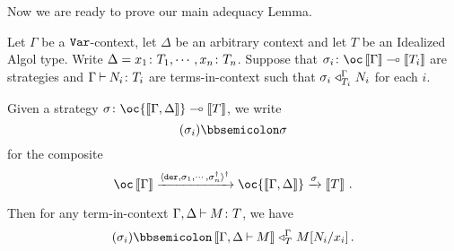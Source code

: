 Now we are ready to prove our main adequacy Lemma.

\begin{lemma}
  Let $\Gamma$ be a ${\mathtt{Var}}$-context, let $\Delta$ be an arbitrary context and let $T$ be an Idealized Algol type.
  Write $\Delta=x_1\colon T_1,\cdots,x_n\colon T_n$.  
  Suppose that $\sigma_i\from \oc\deno{\Gamma} \implies \deno{T_i}$ are strategies and $\Gamma\mathbin{\vdash} N_i\colon T_i$ are terms-in-context such that $\sigma_i\mathrel{\triangleleft}_{T_i}^\Gamma N_i$ for each $i$.  

  Given a strategy $\sigma\from \oc{\deno{\Gamma,\Delta}}\implies \deno{T}$, we write
  \[
    (\sigma_i)\semicom \sigma
    \]
  for the composite
  \[
    \oc\deno{\Gamma} \xrightarrow{\langle \der,\sigma_1,\cdots,\sigma_n^\dag\rangle^\dag} \oc{\deno{\Gamma,\Delta}} \xrightarrow{\sigma} \deno{T}\,.
    \]

  Then for any term-in-context $\Gamma,\Delta \mathbin{\vdash} M\colon T$, we have
  \[
    (\sigma_i)\semicom\deno{\Gamma,\Delta\ts M} \plot_T^{\Gamma} M[N_i/x_i]\,.
    \]
  \label{LemAdequacy}
\end{lemma}
